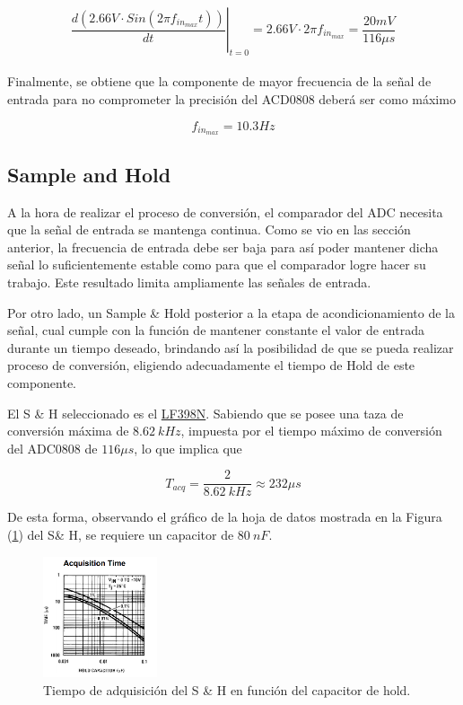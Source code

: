 \begin{equation}
\left. \frac{d \left( 2.66V \cdot Sin \left( 2\pi f_{in_{max}} t \right) \right)}{dt} \right|_{t=0} = 2.66V \cdot 2\pi f_{in_{max}} = \frac{20mV}{116\mu s}
\end{equation}
\\


Finalmente, se obtiene que la componente de mayor frecuencia de la señal de entrada para no comprometer la precisión del ACD0808 deberá ser como máximo

$$f_{in_{max}} = 10.3Hz$$

\subsection{Sample and Hold}
A la hora de realizar el proceso de conversión, el comparador del ADC necesita que la señal de entrada se mantenga continua. Como se vio en las sección anterior, la frecuencia de entrada debe ser baja para así poder mantener dicha señal lo suficientemente estable como para que el comparador logre hacer su trabajo. Este resultado limita ampliamente las señales de entrada.
 
Por otro lado, un Sample \& Hold posterior a la etapa de acondicionamiento de la señal, cual cumple con la función de mantener constante el valor de entrada durante un tiempo deseado, brindando así la posibilidad de que se pueda realizar proceso de conversión, eligiendo adecuadamente el tiempo de Hold de este componente.

El S \& H seleccionado es el \href{https://pdf1.alldatasheet.es/datasheet-pdf/view/8580/NSC/LF398N.html}{LF398N}. Sabiendo que se posee una taza de conversión máxima de $8.62 \ kHz$, impuesta por el tiempo máximo de conversión del ADC0808 de $116 \mu s$, lo que implica que

\begin{equation*}
	T_{acq} = \frac{2}{8.62 \ kHz} \approx 232 \mu s
\end{equation*}

De esta forma, observando el gráfico de la hoja de datos mostrada en la Figura (\ref{chacqtime}) del S\& H, se requiere un capacitor de $80 \ nF$.

\begin{figure}[H]
	\centering
	\includegraphics[width=0.3\textwidth]{ImagenesEjercicio1/chacqtime.png}
\caption{Tiempo de adquisición del S \& H en función del capacitor de hold.}
	\label{chacqtime}
\end{figure}


